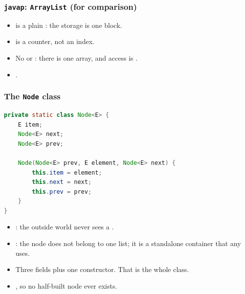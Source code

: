 \documentclass[aspectratio=169,10pt,compress]{beamer}
\begin{document}
\begin{frame}[t,fragile] \frametitle{\texttt{javap}: \texttt{ArrayList} (for comparison)}
  \begin{itemize}\small
    \item {} is a plain : the storage is one block.
    \item {} is a counter, not an index.
    \item No  or : there is one array, and access
          is .
    \item {}.
  \end{itemize}
\end{frame}




\begin{frame}[t,fragile] \frametitle{The \texttt{Node} class}
\begin{lstlisting}[language=Java, basicstyle=\ttfamily\small, frame=single, xleftmargin=2em]
private static class Node<E> {
    E item;
    Node<E> next;
    Node<E> prev;

    Node(Node<E> prev, E element, Node<E> next) {
        this.item = element;
        this.next = next;
        this.prev = prev;
    }
}
\end{lstlisting}
  \begin{itemize}\small
    \item {}: the outside world never sees a .
    \item {}: the node does not belong to one list;
          it is a standalone container that any  uses.
    \item Three fields plus one constructor. That is the whole class.
    \item {}, so no
          half-built node ever exists.
  \end{itemize}
\end{frame}
\end{document}
